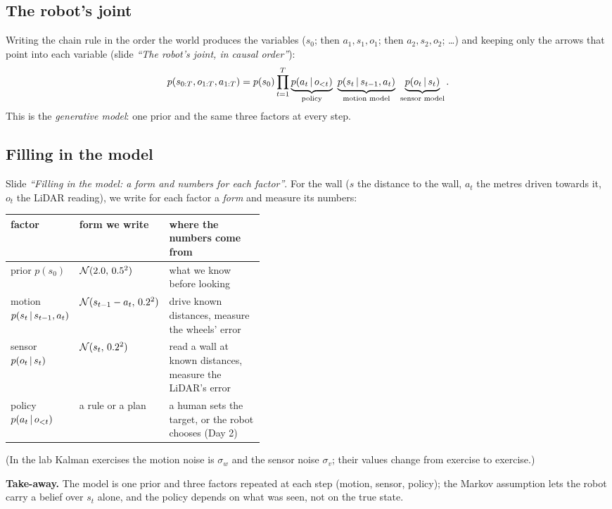 \documentclass[11pt]{article}
\newcommand{\slide}[1]{\textit{``#1''}}
\begin{document}
\subsection*{The robot's joint}
Writing the chain rule in the order the world produces the variables ($s_0$; then $a_1,s_1,o_1$; then $a_2,s_2,o_2$; \dots) and keeping only the arrows that point into each variable (slide \slide{The robot's joint, in causal order}):
\[
p(s_{0:T},o_{1:T},a_{1:T})=p(s_0)\prod_{t=1}^{T}\underbrace{p(a_t\,|\, o_{<t})}_{\text{policy}}\ \underbrace{p(s_t\,|\, s_{t-1},a_t)}_{\text{motion model}}\ \underbrace{p(o_t\,|\, s_t)}_{\text{sensor model}} .
\]
This is the \emph{generative model}: one prior and the same three factors at every step.

\subsection*{Filling in the model}
Slide \slide{Filling in the model: a form and numbers for each factor}. For the wall ($s$ the distance to the wall, $a_t$ the metres driven towards it, $o_t$ the LiDAR reading), we write for each factor a \emph{form} and measure its numbers:
\begin{center}
\begin{tabular}{llp{0.42\linewidth}}
\toprule factor & form we write & where the numbers come from\\\midrule
prior $p(s_0)$ & $\mathcal{N}(2.0,\,0.5^2)$ & what we know before looking\\
motion $p(s_t\,|\, s_{t-1},a_t)$ & $\mathcal{N}(s_{t-1}-a_t,\,0.2^2)$ & drive known distances, measure the wheels' error\\
sensor $p(o_t\,|\, s_t)$ & $\mathcal{N}(s_t,\,0.2^2)$ & read a wall at known distances, measure the LiDAR's error\\
policy $p(a_t\,|\, o_{<t})$ & a rule or a plan & a human sets the target, or the robot chooses (Day 2)\\\bottomrule
\end{tabular}
\end{center}
(In the lab Kalman exercises the motion noise is $\sigma_w$ and the sensor noise $\sigma_v$; their values change from exercise to exercise.)

\begin{keyidea}
\textbf{Take-away.} The model is one prior and three factors repeated at each step (motion, sensor, policy); the Markov assumption lets the robot carry a belief over $s_t$ alone, and the policy depends on what was seen, not on the true state.
\end{keyidea}
\end{document}
